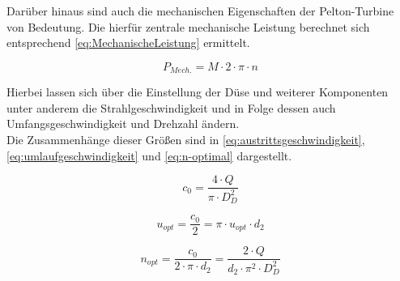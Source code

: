 Darüber hinaus sind auch die mechanischen Eigenschaften der Pelton-Turbine von Bedeutung.
Die hierfür zentrale mechanische Leistung berechnet sich entsprechend \autoref{eq:MechanischeLeistung} ermittelt.

\begin{equation}
	P_{Mech.}= M \cdot 2 \cdot \pi \cdot n
\label{eq:MechanischeLeistung}
\end{equation}

Hierbei lassen sich über die Einstellung der Düse und weiterer Komponenten unter anderem die Strahlgeschwindigkeit
und in Folge dessen auch Umfangsgeschwindigkeit und Drehzahl ändern.\\
Die Zusammenhänge dieser Größen sind in \autoref{eq:austrittsgeschwindigkeit},\autoref{eq:umlaufgeschwindigkeit} und \autoref{eq:n-optimal} dargestellt.

\begin{equation}
    c_{0}=\frac{4 \cdot Q}{\pi \cdot D_{D}^2}
      \label{eq:austrittsgeschwindigkeit}
    \end{equation}

  \begin{equation}
    u_{opt} = \frac{c_{0}}{2}=\pi \cdot u_{opt} \cdot d_{2}
    \label{eq:umlaufgeschwindigkeit}
  \end{equation}
    
    \begin{equation}
     n_{opt}=\frac{c_{0}}{2 \cdot \pi \cdot d_{2}}=\frac{2 \cdot Q}{d_{2} \cdot \pi^2  \cdot D_{D}^2}
    \label{eq:n-optimal}
    \end{equation}